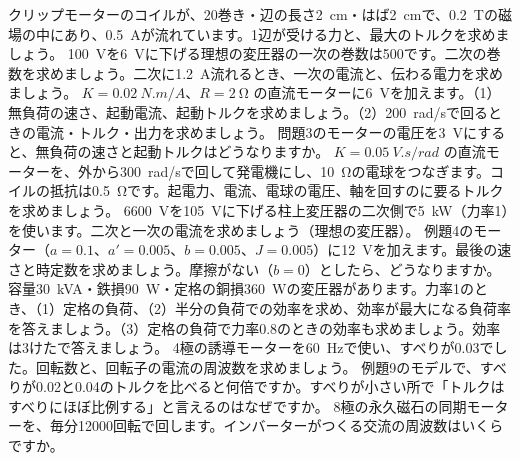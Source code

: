 \bkendproblems
{}
\bkproblem クリップモーターのコイルが、20巻き・辺の長さ\qty{2}{cm}・はば\qty{2}{cm}で、\qty{0.2}{T}の磁場の中にあり、\qty{0.5}{A}が流れています。1辺が受ける力と、最大のトルクを求めましょう。
\bkproblem \qty{100}{V}を\qty{6}{V}に下げる理想の変圧器の一次の巻数は500です。二次の巻数を求めましょう。二次に\qty{1.2}{A}流れるとき、一次の電流と、伝わる電力を求めましょう。
\bkproblem $K=\qty{0.02}{N.m/A}$、$R=\qty{2}{\ohm}$ の直流モーターに\qty{6}{V}を加えます。（1）無負荷の速さ、起動電流、起動トルクを求めましょう。（2）\qty{200}{rad/s}で回るときの電流・トルク・出力を求めましょう。
\bkproblem 問題3のモーターの電圧を\qty{3}{V}にすると、無負荷の速さと起動トルクはどうなりますか。
\bkproblem $K=\qty{0.05}{V.s/rad}$ の直流モーターを、外から\qty{300}{rad/s}で回して発電機にし、\qty{10}{\ohm}の電球をつなぎます。コイルの抵抗は\qty{0.5}{\ohm}です。起電力、電流、電球の電圧、軸を回すのに要るトルクを求めましょう。
\bkproblem \qty{6600}{V}を\qty{105}{V}に下げる柱上変圧器の二次側で\qty{5}{kW}（力率1）を使います。二次と一次の電流を求めましょう（理想の変圧器）。
\bkproblem 例題4のモーター（$a=0.1$、$a'=0.005$、$b=0.005$、$J=0.005$）に\qty{12}{V}を加えます。最後の速さと時定数を求めましょう。摩擦がない（$b=0$）としたら、どうなりますか。
\bkproblem 容量\qty{30}{kVA}・鉄損\qty{90}{W}・定格の銅損\qty{360}{W}の変圧器があります。力率1のとき、（1）定格の負荷、（2）半分の負荷での効率を求め、効率が最大になる負荷率を答えましょう。（3）定格の負荷で力率0.8のときの効率も求めましょう。効率は3けたで答えましょう。
\bkproblem 4極の誘導モーターを\qty{60}{Hz}で使い、すべりが0.03でした。回転数と、回転子の電流の周波数を求めましょう。
\bkproblem 例題9のモデルで、すべりが0.02と0.04のトルクを比べると何倍ですか。すべりが小さい所で「トルクはすべりにほぼ比例する」と言えるのはなぜですか。
\bkproblem 8極の永久磁石の同期モーターを、毎分\num{12000}回転で回します。インバーターがつくる交流の周波数はいくらですか。

